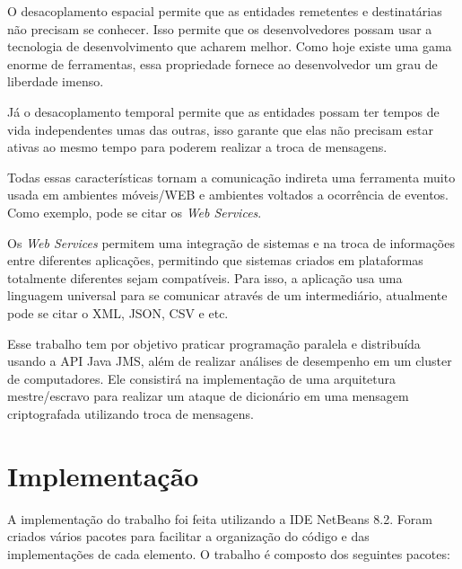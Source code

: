 \documentclass[
	12pt,				%
    oneside,			%
	a4paper,			%
	english,			%
	brazil,				%
	]{abntex2}
\begin{document}
O desacoplamento espacial permite que as entidades remetentes e destinatárias não precisam se conhecer. Isso permite que os desenvolvedores possam usar a tecnologia de desenvolvimento que acharem melhor. Como hoje existe uma gama enorme de ferramentas, essa propriedade fornece ao desenvolvedor um grau de liberdade imenso.

Já o desacoplamento temporal permite que as entidades possam ter tempos de vida independentes umas das outras, isso garante que elas não precisam estar ativas ao mesmo tempo para poderem realizar a troca de mensagens.

Todas essas características tornam a comunicação indireta uma ferramenta muito usada em ambientes móveis/WEB e ambientes voltados a ocorrência de eventos. Como exemplo, pode se citar os \textit{Web Services}.

Os \textit{Web Services} permitem uma integração de sistemas e na troca de informações entre diferentes aplicações, permitindo que sistemas criados em plataformas totalmente diferentes sejam compatíveis. Para isso, a aplicação usa uma linguagem universal para se comunicar através de um intermediário, atualmente pode se citar o XML, JSON, CSV e etc.

Esse trabalho tem por objetivo praticar programação paralela e distribuída usando a API Java JMS, além de 
realizar análises de desempenho em um cluster de computadores. Ele consistirá na implementação de uma arquitetura mestre/escravo para realizar um ataque de dicionário em uma mensagem criptografada utilizando troca de mensagens.


\chapter{Implementação} 
A implementação do trabalho foi feita utilizando a IDE NetBeans 8.2. Foram criados vários pacotes para facilitar a organização 
do código e das implementações de cada elemento. O trabalho é composto dos seguintes pacotes:
\end{document}
